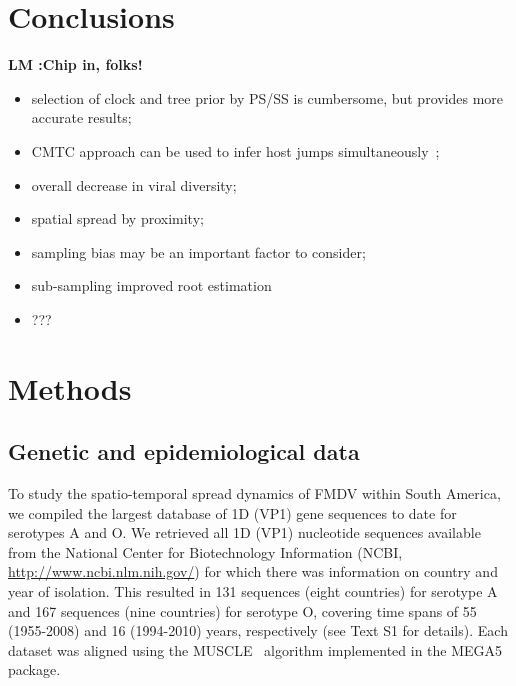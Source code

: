 \documentclass[10pt]{article}
\begin{document}
\section*{Conclusions}
{\bf LM :Chip in, folks!}
\begin{itemize}
 \item selection of clock and tree prior by PS/SS is cumbersome, but provides more accurate results;
 \item CMTC approach can be used to infer host jumps simultaneously~\cite{hall2013};
 \item overall decrease in viral diversity;
 \item spatial spread by proximity;
 \item sampling bias may be an important factor to consider;
 \item sub-sampling improved root estimation %
 \item ???
\end{itemize}

\section*{Methods}

\subsection*{Genetic and epidemiological data}

To study the spatio-temporal spread dynamics of FMDV within South America, we compiled the largest database of 1D (VP1) gene sequences to date for serotypes A and O.
We retrieved all 1D (VP1) nucleotide sequences available from the National Center for Biotechnology Information (NCBI, \url{ http://www.ncbi.nlm.nih.gov/}) for which there was information on country and year of isolation.
This resulted in 131 sequences (eight countries) for serotype A and 167 sequences (nine countries) for serotype O, covering time spans of 55 (1955-2008) and 16 (1994-2010) years, respectively (see Text S1 for details).
Each dataset was aligned using the MUSCLE~\cite{muscle} algorithm implemented in the MEGA5~\cite{MEGA} package.
\end{document}
